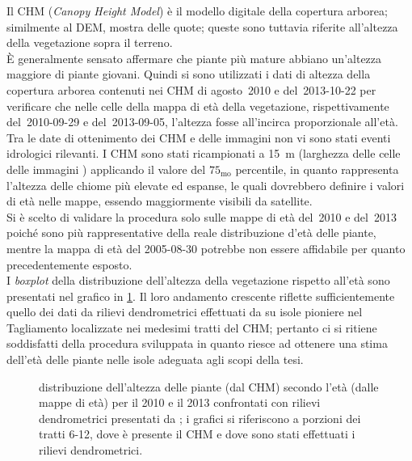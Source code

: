 Il CHM (\emph{Canopy Height Model}) è il modello digitale della copertura arborea; similmente al DEM, mostra delle quote; queste sono tuttavia riferite all'altezza della vegetazione sopra il terreno.
\\
È generalmente sensato affermare che piante più mature abbiano un'altezza maggiore di piante giovani.
Quindi si sono utilizzati i dati di altezza della copertura arborea contenuti nei CHM di agosto~2010 e del~2013-10-22 per verificare che nelle celle della mappa di età della vegetazione, rispettivamente del~2010-09-29 e del~2013-09-05, l'altezza fosse all'incirca proporzionale all'età.
Tra le date di ottenimento dei CHM e delle immagini \AST{} non vi sono stati eventi idrologici rilevanti.
I CHM sono stati ricampionati a \SI{15}{\m} (larghezza delle celle delle immagini \AST{}) applicando il valore del $75_{\mathrm{mo}}$ percentile, in quanto rappresenta l'altezza delle chiome più elevate ed espanse, le quali dovrebbero definire i valori di età nelle mappe, essendo maggiormente visibili da satellite.
\\
Si è scelto di validare la procedura solo sulle mappe di età del~2010 e del~2013 poiché sono più rappresentative della reale distribuzione d'età delle piante, mentre la mappa di età del 2005-08-30 potrebbe non essere affidabile per quanto precedentemente esposto.
\\
I \emph{boxplot} della distribuzione dell'altezza della vegetazione rispetto all'età sono presentati nel grafico in \cref{graph:altezza-chm-eta}.
Il loro andamento crescente riflette sufficientemente quello dei dati da rilievi dendrometrici effettuati da  su isole pioniere nel Tagliamento localizzate nei medesimi tratti del CHM; pertanto ci si ritiene soddisfatti della procedura sviluppata in quanto riesce ad ottenere una stima dell'età delle piante nelle isole adeguata agli scopi della tesi.
%
\begin{figure}
	\centering
	
	\caption[distribuzione dell'altezza delle piante secondo l'età]{distribuzione dell'altezza delle piante (dal CHM) secondo l'età (dalle mappe di età) per il 2010 e il 2013 confrontati con rilievi dendrometrici presentati da ; i grafici si riferiscono a porzioni dei tratti 6-12, dove è presente il CHM e dove sono stati effettuati i rilievi dendrometrici.}
	\label{graph:altezza-chm-eta}
\end{figure}
%


